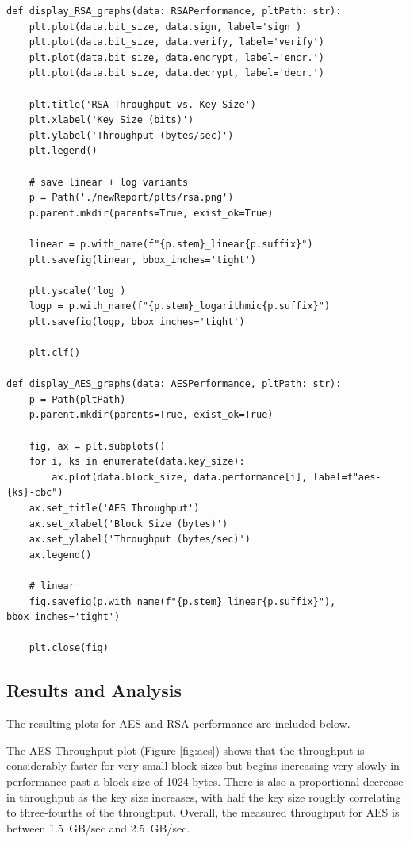 \documentclass[11pt]{article}
\begin{document}
\begin{lstlisting}
def display_RSA_graphs(data: RSAPerformance, pltPath: str): 
    plt.plot(data.bit_size, data.sign, label='sign')
    plt.plot(data.bit_size, data.verify, label='verify')
    plt.plot(data.bit_size, data.encrypt, label='encr.')
    plt.plot(data.bit_size, data.decrypt, label='decr.')

    plt.title('RSA Throughput vs. Key Size')
    plt.xlabel('Key Size (bits)')
    plt.ylabel('Throughput (bytes/sec)')
    plt.legend()
       
    # save linear + log variants
    p = Path('./newReport/plts/rsa.png')
    p.parent.mkdir(parents=True, exist_ok=True)

    linear = p.with_name(f"{p.stem}_linear{p.suffix}")
    plt.savefig(linear, bbox_inches='tight')

    plt.yscale('log')
    logp = p.with_name(f"{p.stem}_logarithmic{p.suffix}")
    plt.savefig(logp, bbox_inches='tight')

    plt.clf()

def display_AES_graphs(data: AESPerformance, pltPath: str):
    p = Path(pltPath)
    p.parent.mkdir(parents=True, exist_ok=True)

    fig, ax = plt.subplots()
    for i, ks in enumerate(data.key_size):
        ax.plot(data.block_size, data.performance[i], label=f"aes-{ks}-cbc")
    ax.set_title('AES Throughput')
    ax.set_xlabel('Block Size (bytes)')
    ax.set_ylabel('Throughput (bytes/sec)')
    ax.legend()

    # linear
    fig.savefig(p.with_name(f"{p.stem}_linear{p.suffix}"), bbox_inches='tight')

    plt.close(fig)

\end{lstlisting}

\subsection*{Results and Analysis}

The resulting plots for AES and RSA performance are included below.

The AES Throughput plot (Figure \ref{fig:aes}) shows that the throughput is considerably faster for very small block sizes but begins increasing very slowly in performance past a block size of 1024 bytes. There is also a proportional decrease in throughput as the key size increases, with half the key size roughly correlating to three-fourths of the throughput. Overall, the measured throughput for AES is between 1.5~GB/sec and 2.5~GB/sec.
\end{document}
